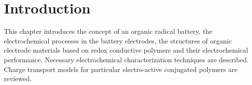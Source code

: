 \chapter{Introduction}
This chapter introduces the concept of an organic radical battery, the electrochemical processes in the battery electrodes, the structures of organic electrode materials based on redox conductive polymers and their electrochemical performance. Necessary electrochemical characterization techniques are described. Charge transport models for particular electro-active conjugated polymers are reviewed.

%
%

